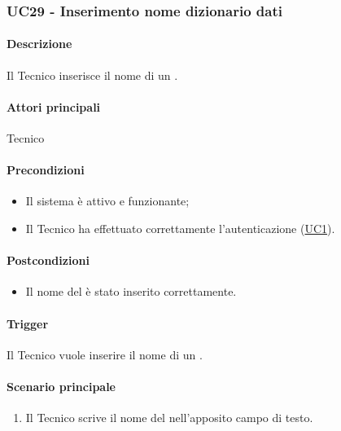 \subsubsection{UC29 - Inserimento nome dizionario dati}\label{UC29}
\paragraph*{Descrizione}
Il Tecnico inserisce il nome di un .

\paragraph*{Attori principali}
Tecnico

\paragraph*{Precondizioni}
\begin{itemize}
  \item Il sistema è attivo e funzionante;
  \item Il Tecnico ha effettuato correttamente l'autenticazione (\hyperref[UC1]{UC1}).
\end{itemize}

\paragraph*{Postcondizioni}
\begin{itemize}
  \item Il nome del  è stato inserito correttamente.
\end{itemize}

\paragraph*{Trigger}
Il Tecnico vuole inserire il nome di un .

\paragraph*{Scenario principale}
\begin{enumerate}
  \item Il Tecnico scrive il nome del  nell'apposito campo di testo.
\end{enumerate}
